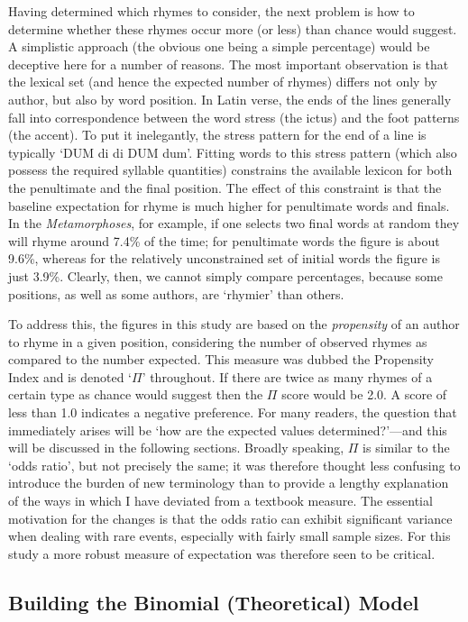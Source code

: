 \documentclass[twocolumn, switch]{article} %
\begin{document}
Having determined which rhymes to consider, the next problem is how to
determine whether these rhymes occur more (or less) than chance would suggest.
A simplistic approach (the obvious one being a simple percentage) would be
deceptive here for a number of reasons. The most important observation is that
the lexical set (and hence the expected number of rhymes) differs not only by
author, but also by word position. In Latin verse, the ends of the lines
generally fall into correspondence between the word stress (the ictus) and the
foot patterns (the accent). To put it inelegantly, the stress pattern for the
end of a line is typically `DUM di di DUM dum'. Fitting words to this stress
pattern (which also possess the required syllable quantities) constrains the
available lexicon for both the penultimate and the final position. The effect
of this constraint is that the baseline expectation for rhyme is much higher
for penultimate words and finals. In the \emph{Metamorphoses}, for example, if
one selects two final words at random they will rhyme around 7.4\% of the
time; for penultimate words the figure is about 9.6\%, whereas for the
relatively unconstrained set of initial words the figure is just 3.9\%.
Clearly, then, we cannot simply compare percentages, because some positions,
as well as some authors, are `rhymier' than others.

To address this, the figures in this study are based on the \emph{propensity}
of an author to rhyme in a given position, considering the number of observed
rhymes as compared to the number expected. This measure was dubbed the
Propensity Index and is denoted `$\Pi$' throughout. If there are twice as many
rhymes of a certain type as chance would suggest then the $\Pi$ score would be
2.0. A score of less than 1.0 indicates a negative preference. For many
readers, the question that immediately arises will be `how are the expected
values determined?'---and this will be discussed in the following sections.
Broadly speaking, $\Pi$ is similar to the `odds ratio', but not precisely
the same; it was therefore thought less confusing to introduce the burden of
new terminology than to provide a lengthy explanation of the ways in which I
have deviated from a textbook measure. The essential motivation for the
changes is that the odds ratio can exhibit significant variance when dealing
with rare events, especially with fairly small sample sizes. For this study a
more robust measure of expectation was therefore seen to be critical.

\subsection{Building the Binomial (Theoretical) Model} 
\end{document}
